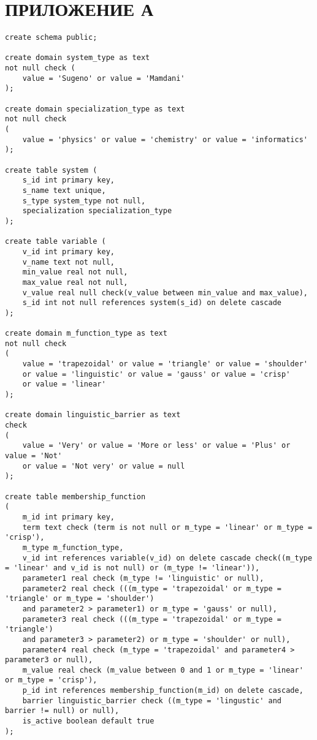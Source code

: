 \section*{ПРИЛОЖЕНИЕ А}
\begin{lstlisting}[caption=Создание таблиц (часть 1), label={lst:creation}]
create schema public;

create domain system_type as text
not null check (
	value = 'Sugeno' or value = 'Mamdani'
);

create domain specialization_type as text
not null check 
(
	value = 'physics' or value = 'chemistry' or value = 'informatics'
);

create table system (
	s_id int primary key,
	s_name text unique,
	s_type system_type not null,
	specialization specialization_type
);

create table variable (
	v_id int primary key,
	v_name text not null,
	min_value real not null,
	max_value real not null,
	v_value real null check(v_value between min_value and max_value),
	s_id int not null references system(s_id) on delete cascade
);

create domain m_function_type as text
not null check
(
	value = 'trapezoidal' or value = 'triangle' or value = 'shoulder'
	or value = 'linguistic' or value = 'gauss' or value = 'crisp' 
	or value = 'linear'
);

create domain linguistic_barrier as text
check 
(
	value = 'Very' or value = 'More or less' or value = 'Plus' or value = 'Not'
	or value = 'Not very' or value = null
);

create table membership_function
(
	m_id int primary key,
	term text check (term is not null or m_type = 'linear' or m_type = 'crisp'),
	m_type m_function_type,
	v_id int references variable(v_id) on delete cascade check((m_type = 'linear' and v_id is not null) or (m_type != 'linear')),
	parameter1 real check (m_type != 'linguistic' or null),
	parameter2 real check (((m_type = 'trapezoidal' or m_type = 'triangle' or m_type = 'shoulder') 
	and parameter2 > parameter1) or m_type = 'gauss' or null),
	parameter3 real check (((m_type = 'trapezoidal' or m_type = 'triangle') 
	and parameter3 > parameter2) or m_type = 'shoulder' or null),
	parameter4 real check (m_type = 'trapezoidal' and parameter4 > parameter3 or null),
	m_value real check (m_value between 0 and 1 or m_type = 'linear' or m_type = 'crisp'),
	p_id int references membership_function(m_id) on delete cascade,
	barrier linguistic_barrier check ((m_type = 'lingustic' and barrier != null) or null),
	is_active boolean default true
);


\end{lstlisting}
